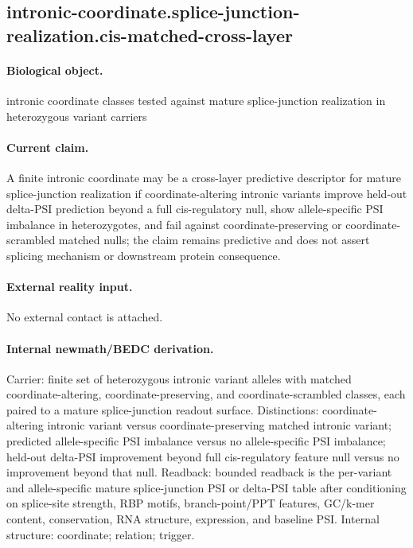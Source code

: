 \subsection{intronic-coordinate.splice-junction-realization.cis-matched-cross-layer}

\paragraph{Biological object.} intronic coordinate classes tested against mature splice-junction realization in heterozygous variant carriers

\paragraph{Current claim.} A finite intronic coordinate may be a cross-layer predictive descriptor for mature splice-junction realization if coordinate-altering intronic variants improve held-out delta-PSI prediction beyond a full cis-regulatory null, show allele-specific PSI imbalance in heterozygotes, and fail against coordinate-preserving or coordinate-scrambled matched nulls; the claim remains predictive and does not assert splicing mechanism or downstream protein consequence.

\paragraph{External reality input.}
No external contact is attached.

\paragraph{Internal newmath/BEDC derivation.} Carrier: finite set of heterozygous intronic variant alleles with matched coordinate-altering, coordinate-preserving, and coordinate-scrambled classes, each paired to a mature splice-junction readout surface. Distinctions: coordinate-altering intronic variant versus coordinate-preserving matched intronic variant; predicted allele-specific PSI imbalance versus no allele-specific PSI imbalance; held-out delta-PSI improvement beyond full cis-regulatory feature null versus no improvement beyond that null. Readback: bounded readback is the per-variant and allele-specific mature splice-junction PSI or delta-PSI table after conditioning on splice-site strength, RBP motifs, branch-point/PPT features, GC/k-mer content, conservation, RNA structure, expression, and baseline PSI. Internal structure: coordinate; relation; trigger.

